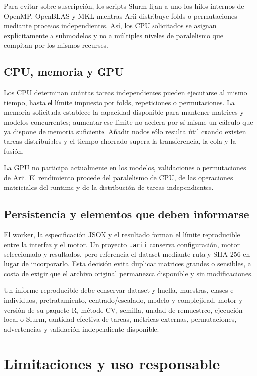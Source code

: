 \documentclass[11pt,a4paper,openany]{report}
\newcommand{\code}[1]{\texttt{#1}}
\begin{document}
Para evitar sobre-suscripción, los scripts Slurm fijan a uno los hilos internos de OpenMP, OpenBLAS y MKL mientras Arii distribuye folds o permutaciones mediante procesos independientes. Así, los CPU solicitados se asignan explícitamente a submodelos y no a múltiples niveles de paralelismo que compitan por los mismos recursos.

\section{CPU, memoria y GPU}

Los CPU determinan cuántas tareas independientes pueden ejecutarse al mismo tiempo, hasta el límite impuesto por folds, repeticiones o permutaciones. La memoria solicitada establece la capacidad disponible para mantener matrices y modelos concurrentes; aumentar ese límite no acelera por sí mismo un cálculo que ya dispone de memoria suficiente. Añadir nodos sólo resulta útil cuando existen tareas distribuibles y el tiempo ahorrado supera la transferencia, la cola y la fusión.

La GPU no participa actualmente en los modelos, validaciones o permutaciones de Arii. El rendimiento procede del paralelismo de CPU, de las operaciones matriciales del runtime y de la distribución de tareas independientes.

\section{Persistencia y elementos que deben informarse}

El worker, la especificación JSON y el resultado forman el límite reproducible entre la interfaz y el motor. Un proyecto \code{.arii} conserva configuración, motor seleccionado y resultados, pero referencia el dataset mediante ruta y SHA-256 en lugar de incorporarlo. Esta decisión evita duplicar matrices grandes o sensibles, a costa de exigir que el archivo original permanezca disponible y sin modificaciones.

Un informe reproducible debe conservar dataset y huella, muestras, clases e individuos, pretratamiento, centrado/escalado, modelo y complejidad, motor y versión de su paquete R, método CV, semilla, unidad de remuestreo, ejecución local o Slurm, cantidad efectiva de tareas, métricas externas, permutaciones, advertencias y validación independiente disponible.

\chapter{Limitaciones y uso responsable}
\end{document}
